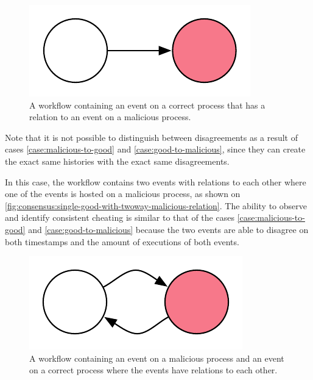 	\begin{figure}[H]
		\centering
		\includegraphics{6validation/images/2.pdf}
		\caption{A workflow containing an event on a correct process that has a relation to an event on a malicious process.}
		\label{fig:consensus:single-good-with-malicious-relation}
	\end{figure}

	\noindent Note that it is not possible to distinguish between disagreements as a result of cases \ref{case:malicious-to-good} and \ref{case:good-to-malicious}, since they can create the exact same histories with the exact same disagreements.
	
	\begin{case}
		In this case, the workflow contains two events with relations to each other where one of the events is hosted on a malicious process, as shown on \autoref{fig:consensus:single-good-with-twoway-malicious-relation}. The ability to observe and identify consistent cheating is similar to that of the cases \ref{case:malicious-to-good} and \ref{case:good-to-malicious} because the two events are able to disagree on both timestamps and the amount of executions of both events.
	\end{case}
	
	\begin{figure}[H]
		\centering
		\includegraphics{6validation/images/6.pdf}
		\caption{A workflow containing an event on a malicious process and an event on a correct process where the events have relations to each other.}
		\label{fig:consensus:single-good-with-twoway-malicious-relation}
	\end{figure}
	
